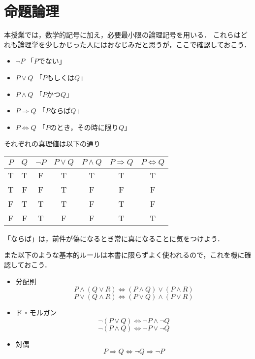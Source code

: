 \documentclass[11pt,a4paper]{jsarticle}
\begin{document}
\section{命題論理}
本授業では，数学的記号に加え，必要最小限の論理記号を用いる．
これらはどれも論理学を少しかじった人にはおなじみだと思うが，ここで確認しておこう．

\begin{itemize}
 \item $\neg P$ 「$P$でない」
 \item $P \vee Q$ 「$P$もしくは$Q$」
 \item $P \wedge Q$ 「$P$かつ$Q$」
 \item $P \Rightarrow Q$ 「$P$ならば$Q$」
 \item $P \iff Q$ 「$P$のとき，その時に限り$Q$」
\end{itemize}

それぞれの真理値は以下の通り

\begin{table}[h]
\centering
\begin{tabular}{cc|ccccc} \hline
 $P$ & $Q$ & $\neg P$ & $P \vee Q$ & $P \wedge Q$ & $P \Rightarrow Q$ & $P \iff Q$ \\ \hline 
 T  & T & F & T & T & T & T \\
 T  & F & F & T & F & F & F \\
 F  & T & T & T & F & T & F \\
 F  & F & T & F & F & T & T \\ \hline
\end{tabular} 
\end{table}

\begin{attn}
「ならば」は，前件が偽になるとき常に真になることに気をつけよう．
\end{attn}

また以下のような基本的ルールは本書に限らずよく使われるので，これを機に確認しておこう．
\begin{itemize}
    \item 分配則
    \[ P \wedge ( Q \vee R ) \iff (P \wedge Q) \vee (P \wedge R) \]
    \[ P \vee ( Q \wedge R ) \iff (P \vee Q) \wedge (P \vee R) \]
    \item ド・モルガン
    \[ \neg (P \vee Q) \iff \neg P \wedge \neg Q \]
    \[ \neg (P \wedge Q) \iff \neg P \vee \neg Q \]
    \item 対偶
    \[ P \Rightarrow Q \iff \neg Q \Rightarrow \neg P \]
\end{itemize}
\end{document}
